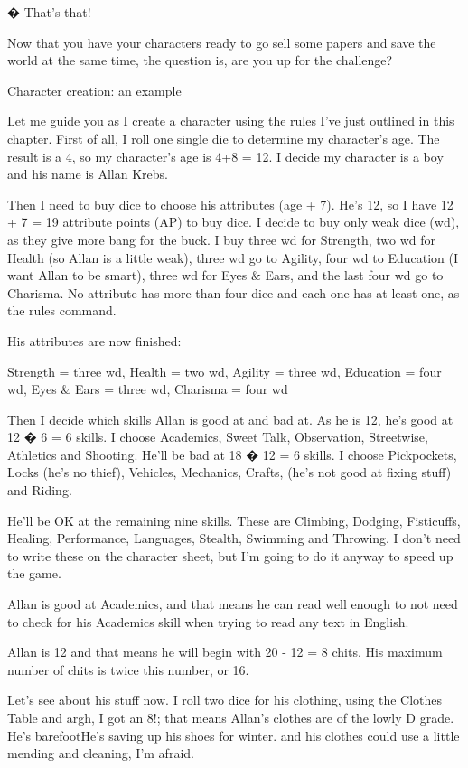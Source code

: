 � That's that!


Now that you have your characters ready to go sell some papers and save the world at the same time, the question is, are you up for the challenge?


Character creation: an example


Let me guide you as I create a character using the rules I've just outlined in this chapter. First of all, I roll one single die to determine my character's age. The result is a 4, so my character's age is 4+8 = 12. I decide my character is a boy and his name is Allan Krebs.


Then I need to buy dice to choose his attributes (age + 7). He's 12, so I have 12 + 7 = 19 attribute points (AP) to buy dice. I decide to buy only weak dice (wd), as they give more bang for the buck. I buy three wd for Strength, two wd for Health (so Allan is a little weak), three wd go to Agility, four wd to Education (I want Allan to be smart), three wd for Eyes & Ears, and the last four wd go to Charisma. No attribute has more than four dice and each one has at least one, as the rules command.


His attributes are now finished:


Strength = three wd, Health = two wd, Agility = three wd, Education = four wd, Eyes & Ears = three wd, Charisma = four wd


Then I decide which skills Allan is good at and bad at. As he is 12, he's good at 12 � 6 = 6 skills. I choose Academics, Sweet Talk, Observation, Streetwise, Athletics and Shooting. He'll be bad at 18 � 12 = 6 skills. I choose Pickpockets, Locks (he's no thief), Vehicles, Mechanics, Crafts, (he's not good at fixing stuff) and Riding.


He'll be OK at the remaining nine skills. These are Climbing, Dodging, Fisticuffs, Healing, Performance, Languages, Stealth, Swimming and Throwing. I don't need to write these on the character sheet, but I'm going to do it anyway to speed up the game.


Allan is good at Academics, and that means he can read well enough to not need to check for his Academics skill when trying to read any text in English. 


Allan is 12 and that means he will begin with 20 - 12 = 8 chits. His maximum number of chits is twice this number, or 16.


Let's see about his stuff now. I roll two dice for his clothing, using the Clothes Table and argh, I got an 8!; that means Allan's clothes are of the lowly D grade. He's barefootHe's saving up his shoes for winter. and his clothes could use a little mending and cleaning, I'm afraid. 


